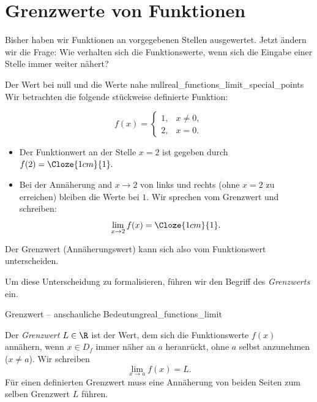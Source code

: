 \section{Grenzwerte von Funktionen}
\label{sec:real_functions_limits}
Bisher haben wir Funktionen an vorgegebenen Stellen ausgewertet.
Jetzt ändern wir die Frage: Wie verhalten sich die Funktionswerte,
wenn sich die Eingabe einer Stelle immer weiter nähert?
\begin{ExampleBox}{Der Wert bei null und die Werte nahe null}{real_functions_limit_special_points}
  Wir betrachten die folgende stückweise definierte Funktion:
  \par\smallskip\noindent
  \begin{minipage}[c]{0.48\linewidth}
    \[
      f(x)=\begin{cases}1,&x\ne0,\\2,&x=0.\end{cases}
    \]
  \end{minipage}\hfill
  \begin{minipage}[c]{0.47\linewidth}
    \centering
  \end{minipage}
  \par\smallskip
  \begin{itemize}
    \item Der Funktionwert an der Stelle $x=2$ ist gegeben durch $f(2)=\Cloze{1cm}{1}.$
    \item Bei der Annäherung and $x \to 2$ von links und rechts (ohne $x=2$ zu erreichen)
    bleiben die Werte bei $1$. Wir sprechen vom Grenzwert und schreiben:
      \[
        \lim_{x\to2}f(x)=\Cloze{1cm}{1}.
      \]
  \end{itemize}
  \par\medskip
  Der Grenzwert (Annäherungswert) kann sich also vom Funktionswert unterscheiden.
\end{ExampleBox}

Um diese Unterscheidung zu formalisieren, führen wir den Begriff des
\emph{Grenzwerts}  ein.
\begin{DefinitionBox}{Grenzwert -- anschauliche Bedeutung}{real_functions_limit}
  \noindent
  \begin{minipage}[c]{0.49\linewidth}
    Der \emph{Grenzwert} $L\in\R$ ist der Wert, dem sich die
    Funktionswerte $f(x)$ annähern, wenn $x\in D_f$ immer näher an $a$
    heranrückt, ohne $a$ selbst anzunehmen ($x\ne a$). Wir schreiben
    \[
      \lim_{x\to a}f(x)=L.
    \]
    Für einen definierten Grenzwert muss eine Annäherung von beiden Seiten zum
    selben Grenzwert $L$ führen.
  \end{minipage}\hfill
  \begin{minipage}[c]{0.47\linewidth}
    \centering
  \end{minipage}
\end{DefinitionBox}

